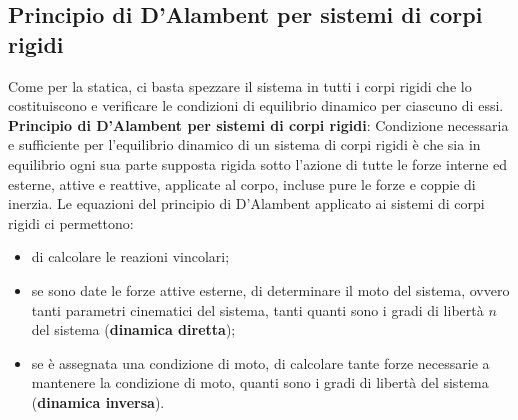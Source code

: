 \subsection{Principio di D'Alambent per sistemi di corpi rigidi}
Come per la statica, ci basta spezzare il sistema in tutti i corpi rigidi che lo costituiscono e verificare le condizioni di equilibrio dinamico per ciascuno di essi.\newline
\newline
\textbf{Principio di D'Alambent per sistemi di corpi rigidi}:\newline
Condizione necessaria e sufficiente per l'equilibrio dinamico di un sistema di corpi rigidi è che sia in equilibrio ogni sua parte supposta rigida sotto l'azione di tutte le forze interne ed esterne, attive e reattive, applicate al corpo, incluse pure le forze e coppie di inerzia.\newline
\newline
Le equazioni del principio di D'Alambent applicato ai sistemi di corpi rigidi ci permettono:
\begin{itemize}
    \item di calcolare le reazioni vincolari;
    \item se sono date le forze attive esterne, di determinare il moto del sistema, ovvero tanti parametri cinematici del sistema, tanti quanti sono i gradi di libertà $n$ del sistema (\textbf{dinamica diretta});
    \item se è assegnata una condizione di moto, di calcolare tante forze necessarie a mantenere la condizione di moto, quanti sono i gradi di libertà del sistema (\textbf{dinamica inversa}).
\end{itemize}